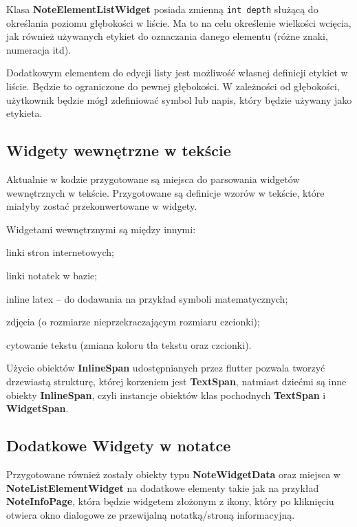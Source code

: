 Klasa \textbf{NoteElementListWidget} posiada zmienną \verb|int depth| służącą do określania poziomu głębokości w liście. Ma to na celu określenie wielkości wcięcia, jak również używanych etykiet do oznaczania danego elementu (różne znaki, numeracja itd).

Dodatkowym elementem do edycji listy jest możliwość własnej definicji etykiet w liście. Będzie to ograniczone do pewnej głębokości. W zależności od głębokości, użytkownik będzie mógł zdefiniować symbol lub napis, który będzie używany jako etykieta.

\subsection{Widgety wewnętrzne w tekście}

Aktualnie w kodzie przygotowane są miejsca do parsowania widgetów wewnętrznych w tekście. Przygotowane są definicje wzorów w tekście, które miałyby zostać przekonwertowane w widgety.

Widgetami wewnętrznymi są między innymi:

\begin{compactitem}
    \item linki stron internetowych;
    \item linki notatek w bazie;
    \item inline latex -- do dodawania na przykład symboli matematycznych;
    \item zdjęcia (o rozmiarze nieprzekraczającym rozmiaru czcionki);
    \item cytowanie tekstu (zmiana koloru tła tekstu oraz czcionki).
\end{compactitem}

Użycie obiektów \textbf{InlineSpan} udostępnianych przez flutter pozwala tworzyć drzewiastą strukturę, której korzeniem jest \textbf{TextSpan}, natmiast dziećmi są inne obiekty \textbf{InlineSpan}, czyli instancje obiektów klas pochodnych \textbf{TextSpan} i \textbf{WidgetSpan}.

\subsection{Dodatkowe Widgety w notatce}

Przygotowane również zostały obiekty typu \textbf{NoteWidgetData} oraz miejsca w \textbf{NoteListElementWidget} na dodatkowe elementy takie jak na przykład \textbf{NoteInfoPage}, która będzie widgetem złożonym z ikony, który po kliknięciu otwiera okno dialogowe ze przewijalną notatką/stroną informacyjną.

